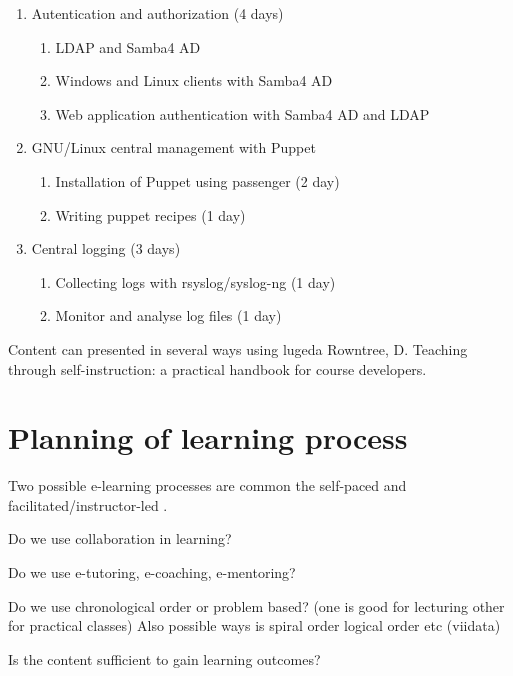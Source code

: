 \begin{enumerate}[label=Hands-on block \arabic*.,leftmargin=*]
\begin{enumerate}[label=LAB \arabic*.,leftmargin=*]
    \end{enumerate}
    \item Autentication and authorization (4 days)
        \begin{enumerate}[label=LAB \arabic*.,leftmargin=*]
  		\item LDAP and Samba4 AD
	  	\item Windows and Linux clients with Samba4 AD 
  		\item Web application authentication with Samba4 AD and LDAP
    		\end{enumerate}
    \item GNU/Linux central management with Puppet
        \begin{enumerate}[label=LAB \arabic*.,leftmargin=*]
	  		\item Installation of Puppet using passenger (2 day)
		  	\item Writing puppet recipes (1 day)
    		\end{enumerate}
    	\item Central logging (3 days)
    	    \begin{enumerate}[label=LAB \arabic*.,leftmargin=*]
	  		\item Collecting logs with rsyslog/syslog-ng (1 day)
		  	\item Monitor and analyse log files (1 day)
    		\end{enumerate}
\end{enumerate}

Content can presented in several ways using {\color{red} lugeda Rowntree, D. Teaching through self-instruction: a practical handbook for course developers.} \citep{rowntree1986teaching}


\section{Planning of learning process}
Two possible e-learning processes are common the self-paced and facilitated/instructor-led \citep[p.~10]{food2011learning}.

Do we use collaboration in learning? 

Do we use  e-tutoring, e-coaching, e-mentoring?

Do we use chronological order or problem based? (one is good for lecturing other for practical classes) Also possible ways is spiral order logical order etc {\color{red} (viidata) }

Is the content sufficient to gain learning outcomes?

